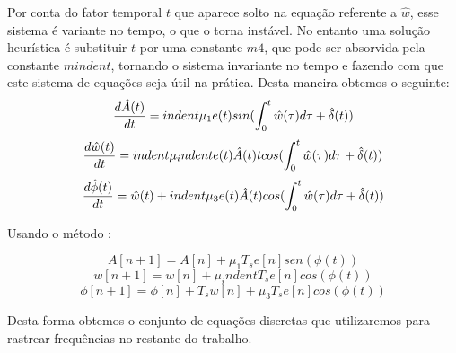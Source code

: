 \documentclass[a4paper, 12pt]{book}
\begin{document}
Por conta do fator temporal $t$ que aparece solto na equação referente a $\hat{w}$, esse sistema é variante no tempo, o que o torna instável. No entanto uma solução heurística é substituir $t$ por uma constante $m4$, que pode ser absorvida pela constante $mindent$, tornando o sistema invariante no tempo e fazendo com que este sistema de equações seja útil na prática. Desta maneira obtemos o seguinte:
\begin{equation}
    \frac{d\hat{A}(t)}{dt}=indent\mu_1e(t)sin(\int_{0}^{t}\hat{w}(\tau)d\tau\space+\space\hat{\delta}(t))
\end{equation}
\begin{equation}
    \frac{d\hat{w}(t)}{dt}=indent\mu_indente(t)\hat{A}(t)tcos(\int_{0}^{t}\hat{w}(\tau)d\tau\space+\space\hat{\delta}(t))
\end{equation}
\begin{equation}
    \frac{d\hat{\phi}(t)}{dt}=\hat{w}(t)+indent\mu_3e(t)\hat{A}(t)cos(\int_{0}^{t}\hat{w}(\tau)d\tau\space+\space\hat{\delta}(t))
\end{equation}

Usando o método :

\begin{equation}
    A[n+1]=A[n]+\mu_1T_s e[n]sen(\phi(t))
\end{equation}
\begin{equation}
    w[n+1]=w[n]+\mu_indentT_s e[n]cos(\phi(t))
\end{equation}
\begin{equation}
    \phi[n+1]=\phi[n] + T_s w[n] + \mu_3T_s e[n]cos(\phi(t))
\end{equation}

Desta forma obtemos o conjunto de equações discretas que utilizaremos para rastrear frequências no restante do trabalho.
\end{document}
